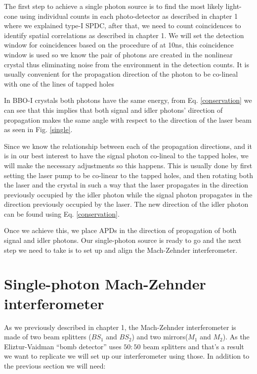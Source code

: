 \documentclass[12pt]{book}
\begin{document}
The first step to achieve a single photon source is to find the most likely light-cone using individual counts in each photo-detector as described in chapter 1  where we explained type-I SPDC, after that, we need to count coincidences to identify spatial correlations as described in chapter 1. We will set the detection window for coincidences based on the procedure of \cite{pearson} at 10ns, this coincidence window is used so we know the pair of photons are created in the nonlinear crystal thus eliminating noise from the environment in the detection counts. It is usually convenient for the propagation direction of the photon to be co-lineal with one of the lines of tapped holes

In BBO-I crystals both photons have the same energy, from Eq. \ref{conservation} we can see that this implies that both signal and idler photons' direction of propagation makes the same angle with respect to the direction of the laser beam as seen in Fig. \ref{single}.

Since we know the relationship between each of the propagation directions, and it is in our best interest to have the signal photon co-lineal to the tapped holes, we will make the necessary adjustments so this happens. This is usually done by first setting the laser pump to be co-linear to the tapped holes, and then rotating both the laser and the crystal in such a way that the laser propagates in the direction previously occupied by the idler photon while the signal photon propagates in the direction previously occupied by the laser. The new direction of the idler photon can be found using Eq. \ref{conservation}.

Once we achieve this, we place APDs in the direction of propagation of both signal and idler photons. Our single-photon source is ready to go and the next step we need to take is to set up and align the Mach-Zehnder interferometer.

\section{Single-photon Mach-Zehnder interferometer}

As we previously described in chapter 1, the Mach-Zehnder interferometer is made of two beam splitters ($BS_{1}$ and $BS_{2}$) and two mirrors($M_{1}$ and $M_{2}$). As the Eliztur-Vaidman ``bomb detector'' uses $50:50$ beam splitters and that's a result we want to replicate we will set up our interferometer using those. In addition to the previous section we will need:
\end{document}
